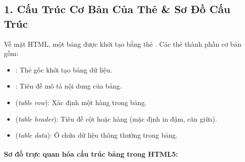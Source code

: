 \subsection{1. Cấu Trúc Cơ Bản Của Thẻ  \& Sơ Đồ Cấu Trúc}

Về mặt HTML, một bảng được khởi tạo bằng thẻ . Các thẻ thành phần cơ bản gồm:
\begin{itemize}[leftmargin=1.8em, itemsep=2pt, parsep=0pt]
    \item {}: Thẻ gốc khởi tạo bảng dữ liệu.
    \item {}: Tiêu đề mô tả nội dung của bảng.
    \item {} (\textit{table row}): Xác định một hàng trong bảng.
    \item {} (\textit{table header}): Tiêu đề cột hoặc hàng (mặc định in đậm, căn giữa).
    \item {} (\textit{table data}): Ô chứa dữ liệu thông thường trong bảng.
\end{itemize}

\paragraph{Sơ đồ trực quan hóa cấu trúc bảng trong HTML5:}

